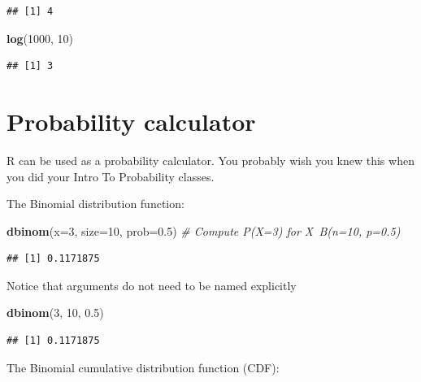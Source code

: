 \documentclass[]{book}
\newenvironment{Shaded}{\begin{snugshade}}{\end{snugshade}}
\newcommand{\KeywordTok}[1]{\textcolor[rgb]{0.13,0.29,0.53}{\textbf{#1}}}
\newcommand{\DataTypeTok}[1]{\textcolor[rgb]{0.13,0.29,0.53}{#1}}
\newcommand{\DecValTok}[1]{\textcolor[rgb]{0.00,0.00,0.81}{#1}}
\newcommand{\FloatTok}[1]{\textcolor[rgb]{0.00,0.00,0.81}{#1}}
\newcommand{\CommentTok}[1]{\textcolor[rgb]{0.56,0.35,0.01}{\textit{#1}}}
\newcommand{\NormalTok}[1]{#1}
\theoremstyle{definition}
\theoremstyle{definition}
\theoremstyle{definition}
\theoremstyle{remark}
\begin{document}
\begin{verbatim}
## [1] 4
\end{verbatim}

\begin{Shaded}
\begin{Highlighting}[]
\KeywordTok{log}\NormalTok{(}\DecValTok{1000}\NormalTok{, }\DecValTok{10}\NormalTok{)                   }
\end{Highlighting}
\end{Shaded}

\begin{verbatim}
## [1] 3
\end{verbatim}

\section{Probability calculator}\label{probability-calculator}

R can be used as a probability calculator. You probably wish you knew
this when you did your Intro To Probability classes.

The Binomial distribution function:

\begin{Shaded}
\begin{Highlighting}[]
\KeywordTok{dbinom}\NormalTok{(}\DataTypeTok{x=}\DecValTok{3}\NormalTok{, }\DataTypeTok{size=}\DecValTok{10}\NormalTok{, }\DataTypeTok{prob=}\FloatTok{0.5}\NormalTok{)  }\CommentTok{# Compute P(X=3) for X~B(n=10, p=0.5) }
\end{Highlighting}
\end{Shaded}

\begin{verbatim}
## [1] 0.1171875
\end{verbatim}

Notice that arguments do not need to be named explicitly

\begin{Shaded}
\begin{Highlighting}[]
\KeywordTok{dbinom}\NormalTok{(}\DecValTok{3}\NormalTok{, }\DecValTok{10}\NormalTok{, }\FloatTok{0.5}\NormalTok{)}
\end{Highlighting}
\end{Shaded}

\begin{verbatim}
## [1] 0.1171875
\end{verbatim}

The Binomial cumulative distribution function (CDF):
\end{document}
